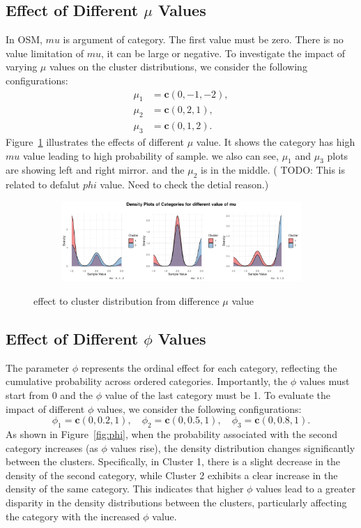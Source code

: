 \documentclass{article}
\begin{document}
\subsection{Effect of Different $\mu$ Values}
In OSM, $mu$ is argument of category. 
The first value must be zero. There is no value limitation of $mu$, it can be large or negative.
To investigate the impact of varying $\mu$ values on the cluster distributions, 
we consider the following configurations:
\[
\begin{aligned}
\mu_1 &= \mathbf{c}(0, -1, -2), \\
\mu_2 &= \mathbf{c}(0, 2, 1), \\
\mu_3 &= \mathbf{c}(0, 1, 2).
\end{aligned}
\]
Figure~\ref{fig:mu} illustrates the effects of different $\mu$ value.
It shows the category has high $mu$ value leading to high probability of sample.
we also can see, $\mu_1$ and $\mu_3$ plots are showing left and right mirror. 
and the $\mu_2$ is in the middle.
( TODO: This is related to defalut $phi$ value. 
Need to check the detial reason.)

\begin{figure}[htbp!]
  \centering
  \begin{subfigure}{1.0\textwidth}
      \centering
      \includegraphics[width=\textwidth]{images/para_sim/mu.png}
  \end{subfigure}
  \caption{effect to cluster distribution from difference $\mu$ value}
  \label{fig:mu}
\end{figure}

\subsection{Effect of Different $\phi$ Values}
The parameter $\phi$ represents the ordinal effect for each category, reflecting the cumulative probability across ordered categories. 
Importantly, the $\phi$ values must start from 0 and the $\phi$ value of the last category must be 1. 
To evaluate the impact of different $\phi$ values, we consider the following configurations:
\[
\phi_1 = \mathbf{c}(0, 0.2, 1), \quad \phi_2 = \mathbf{c}(0, 0.5, 1), \quad \phi_3 = \mathbf{c}(0, 0.8, 1).
\]
As shown in Figure~\ref{fig:phi}, 
when the probability associated with the second category increases (as $\phi$ values rise), 
the density distribution changes significantly between the clusters. 
Specifically, in Cluster 1, there is a slight decrease in the density of the second category, 
while Cluster 2 exhibits a clear increase in the density of the same category. 
This indicates that higher $\phi$ values lead to a greater disparity 
in the density distributions between the clusters, 
particularly affecting the category with the increased $\phi$ value.
\end{document}
